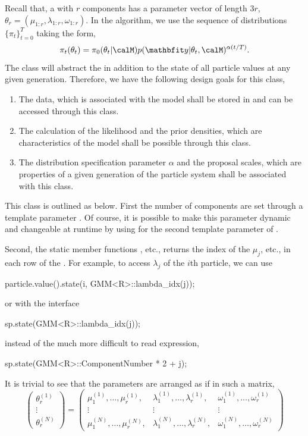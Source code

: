 Recall that, a \gmm with $r$ components has a parameter vector of length $3r$,
$\theta_r = (\mu_{1:r}, \lambda_{1:r}, \omega_{1:r})$. In the \smc[2]
algorithm, we use the sequence of distributions $\{\pi_t\}_{t=0}^T$ taking the
form,
\begin{equation*}
  \pi_t(\theta_t) =
  \pi_0(\theta_t|\calM) p(\data|\theta_t,\calM)^{\alpha(t/T)}.
\end{equation*}
The  class will abstract the \gmm in addition to the state of
all particle values at any given generation. Therefore, we have the following
design goals for this class,
\begin{enumerate}
  \item The data, which is associated with the model shall be stored in and
    can be accessed through this class.
  \item The calculation of the likelihood and the prior densities, which are
    characteristics of the model shall be possible through this class.
  \item The distribution specification parameter $\alpha$ and the \mcmc
    proposal scales, which are properties of a given generation of the
    particle system shall be associated with this class.
\end{enumerate}
This class is outlined as below.
First the number of components are set through a template parameter
. Of course, it is possible to make this parameter dynamic and
changeable at runtime by using  for the second template
parameter of .

Second, the static member functions , etc., returns the
index of the $\mu_j$, etc., in each row of the . For
example, to access $\lambda_j$ of the $i$th particle, we can use
\begin{cppcode}
particle.value().state(i, GMM<R>::lambda_idx(j));
\end{cppcode}
or with the  interface
\begin{cppcode}
sp.state(GMM<R>::lambda_idx(j));
\end{cppcode}
instead of the much more difficult to read expression,
\begin{cppcode}
sp.state(GMM<R>::ComponentNumber * 2 + j);
\end{cppcode}
It is trivial to see that the parameters are arranged as if in such a matrix,
\begin{equation*}
  \begin{pmatrix}
    \theta_r^{(1)} \\ \vdots \\ \theta_r^{(N)}
  \end{pmatrix} =
  \begin{pmatrix}
    \mu_1^{(1)},\dots,\mu_r^{(1)}, &
    \lambda_1^{(1)},\dots,\lambda_r^{(1)}, &
    \omega_1^{(1)},\dots,\omega_r^{(1)} \\
    \vdots & \vdots & \vdots \\
    \mu_1^{(N)},\dots,\mu_r^{(N)}, &
    \lambda_1^{(N)},\dots,\lambda_r^{(N)}, &
    \omega_1^{(N)},\dots,\omega_r^{(N)}
  \end{pmatrix}
\end{equation*}

